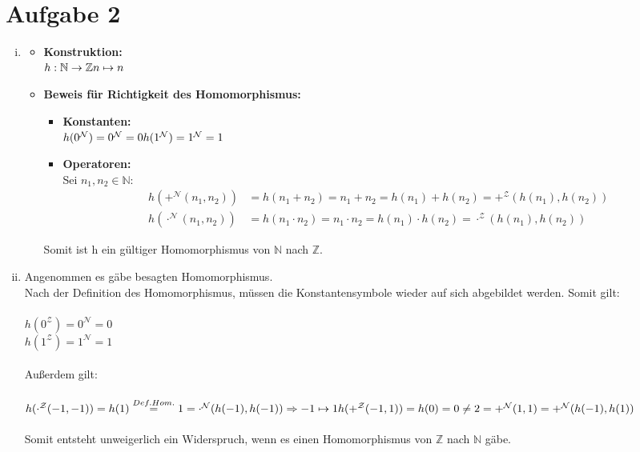 \documentclass[a4paper,10pt]{article}
\newcommand{\N}{\mathbb{N}}
\newcommand{\Z}{\mathbb{Z}}
\begin{document}
\section*{Aufgabe 2}
\begin{enumerate}[(i)]
\item
\begin{itemize}
	\item 	\textbf{Konstruktion: } \\
		\( h: \N \rightarrow \Z \\
		n \mapsto n \)
	\item 	\textbf{Beweis für Richtigkeit des Homomorphismus:} 
		\begin{itemize}
			\item 	\textbf{Konstanten:}\\
				\( h(0^{\mathcal{N}}) = 0^{\mathcal{N}} = 0 \\
				h(1^{\mathcal{N}}) = 1^{\mathcal{N}} = 1 \) 
			\item  	\textbf{Operatoren:} \\
				Sei $n_1,n_2 \in \N$:
				\begin{align*} h(+^{\mathcal{N}} (n_1,n_2)) &= h(n_1 + n_2) = n_1 + n_2 
				= h(n_1) + h(n_2) = +^{\mathcal{Z}} (h(n_1),h(n_2)) \\
				 h(\cdot^{\mathcal{N}} (n_1,n_2)) &= h(n_1 \cdot n_2) = n_1 \cdot n_2 
				= h(n_1) \cdot h(n_2) = \cdot^{\mathcal{Z}} (h(n_1),h(n_2)) \end{align*}
		\end{itemize}
Somit ist h ein gültiger Homomorphismus von $\N$ nach $\Z$.
\end{itemize}

\item
Angenommen es gäbe besagten Homomorphismus. \\
Nach der Definition des Homomorphismus, müssen die Konstantensymbole wieder auf sich abgebildet werden.
Somit gilt: \\
\\
$h(0^{\mathcal{Z}}) = 0^{\mathcal{N}} = 0 $ \\
$h(1^{\mathcal{Z}}) = 1^{\mathcal{N}} = 1 $ \\
\\
Außerdem gilt: \\
\\
\( h(\cdot^{\mathcal{Z}}(-1,-1)) = h(1) \overset{Def. Hom.}{=} 1 = \cdot^{\mathcal{N}}(h(-1),h(-1))\\
\Rightarrow -1 \mapsto 1\\
\\
h(+^{\mathcal{Z}}(-1,1)) = h(0) = 0 \neq 2 = +^{\mathcal{N}}(1,1) = +^{\mathcal{N}}(h(-1),h(1)) \) \\
\\
Somit entsteht unweigerlich ein Widerspruch, wenn es einen Homomorphismus von $\mathbb{Z}$ nach $\mathbb{N}$ gäbe.

\end{enumerate}
\end{document}
